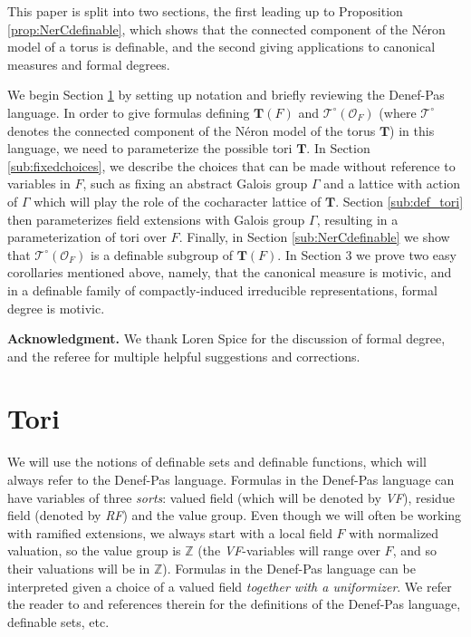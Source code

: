 \documentclass{amsart}
\newcommand{\Z}{{\mathbb Z}}
\newcommand{\ri}{\mathcal{O}}
\newcommand{\bT}{\mathbf {T}}
\newcommand{\NerC}[1]{\mathcal{#1}^\circ}
\theoremstyle{plain}
\theoremstyle{definition}
\begin{document}
This paper is split into two sections, the first leading up to Proposition \ref{prop:NerCdefinable},
which shows that the connected component of the N\'eron model of a torus is definable,
and the second giving applications to canonical measures and formal degrees.

We begin Section \ref{sec:tori} by setting up notation and briefly reviewing the Denef-Pas language.  In order
to give formulas defining $\bT(F)$ and $\NerC{T}(\ri_F)$  (where $\NerC{T}$ denotes the connected
component of the N\'eron model of the torus $\bT$) in this language, we need to parameterize the possible tori $\bT$.
In Section \ref{sub:fixedchoices}, we describe the choices that can be made without reference to variables in $F$,
such as fixing an abstract Galois group $\Gamma$ and a lattice with action of $\Gamma$ which will play the role of the cocharacter lattice of $\bT$.
Section \ref{sub:def_tori} then parameterizes field extensions with Galois group $\Gamma$, resulting in a parameterization
of tori over $F$.  Finally, in Section \ref{sub:NerCdefinable} we show that $\NerC{T}(\ri_F)$ is a definable subgroup of $\bT(F)$.
In Section 3 we prove two easy corollaries mentioned above, namely, that the canonical measure is motivic,
and in a definable family of compactly-induced irreducible representations, formal degree is motivic. 

{\bf Acknowledgment.} We thank Loren Spice for the discussion of formal degree, and the referee for multiple helpful suggestions and corrections.

\section{Tori} \label{sec:tori}
We will use the notions of definable sets and definable functions, which will always refer to the Denef-Pas language. 
Formulas in the Denef-Pas language can have variables of three \emph{sorts}: valued field (which will be denoted by \emph{VF}),
residue field (denoted by \emph{RF}) and the value group. Even though we will often be working with ramified extensions,
we always start with a local field $F$ with normalized valuation, so the value group is $\Z$
(the \emph{VF}-variables will range over $F$, and so their valuations will be in $\Z$).
Formulas in the Denef-Pas language can be interpreted given a choice of a valued field \emph{together with a uniformizer}. 
We refer the reader to \cite{cluckers-gordon-halupczok:14c} and references therein for the definitions of the Denef-Pas language, definable sets, etc. 
\end{document}
